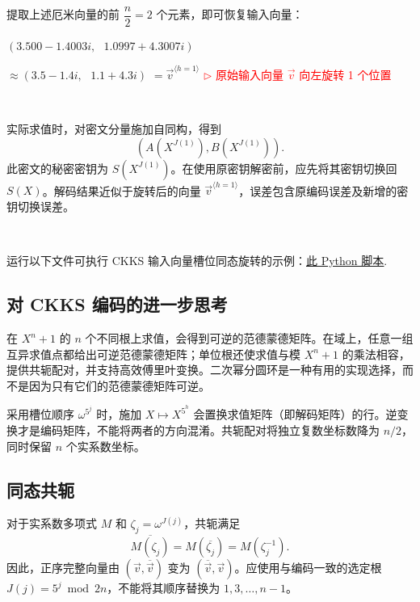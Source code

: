 $ $

提取上述厄米向量的前 $\dfrac{n}{2} = 2$ 个元素，即可恢复输入向量：

$(3.500 - 1.4003i, \text{ } 1.0997 + 4.3007i)$

$ \approx (3.5 - 1.4i, \text{ } 1.1 + 4.3i)$
$ = \vec{v}^{\langle h=1 \rangle}$ \textcolor{red}{  $\rhd$ 原始输入向量 $\vec{v}$ 向左旋转 1 个位置}



$ $

实际求值时，对密文分量施加自同构，得到
\[
(A(X^{J(1)}),B(X^{J(1)})).
\]
此密文的秘密密钥为 $S(X^{J(1)})$。在使用原密钥解密前，应先将其密钥切换回 $S(X)$。解码结果近似于旋转后的向量 $\vec v^{\langle h=1\rangle}$，误差包含原编码误差及新增的密钥切换误差。

$ $


运行以下文件可执行 CKKS 输入向量槽位同态旋转的示例：\href{https://github.com/wang2000star/fhe-textbook-cn/blob/chinese-edition/source%20code/ckks.py}{\underline{此 Python 脚本}}.





\subsection{对 CKKS 编码的进一步思考}
\label{subsec:ckks-encoding-contemplate}

 在 $X^n+1$ 的 $n$ 个不同根上求值，会得到可逆的范德蒙德矩阵。在域上，任意一组互异求值点都给出可逆范德蒙德矩阵；单位根还使求值与模 $X^n+1$ 的乘法相容，提供共轭配对，并支持高效傅里叶变换。二次幂分圆环是一种有用的实现选择，而不是因为只有它们的范德蒙德矩阵可逆。

采用槽位顺序 $\omega^{5^j}$ 时，施加 $X\mapsto X^{5^h}$ 会置换求值矩阵（即解码矩阵）的行。逆变换才是编码矩阵，不能将两者的方向混淆。共轭配对将独立复数坐标数降为 $n/2$，同时保留 $n$ 个实系数坐标。


\subsection{同态共轭}
\label{subsec:ckks-conjugation}

对于实系数多项式 $M$ 和 $\zeta_j=\omega^{J(j)}$，共轭满足
\[
\overline{M(\zeta_j)}=M(\overline{\zeta_j})=M(\zeta_j^{-1}).
\]
因此，正序完整向量由 $(\vec v,\overline{\vec v})$ 变为 $(\overline{\vec v},\vec v)$。应使用与编码一致的选定根 $J(j)=5^j\bmod 2n$，不能将其顺序替换为 $1,3,\ldots,n-1$。

